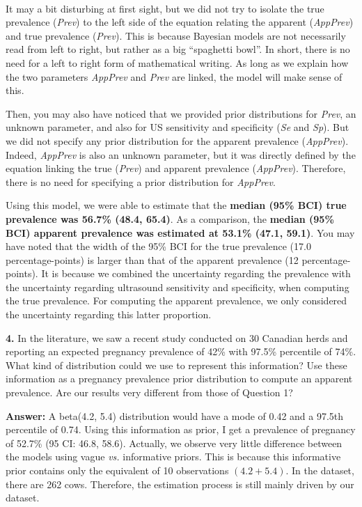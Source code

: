 \documentclass[
]{book}
\begin{document}
\strut \\
It may a bit disturbing at first sight, but we did not try to isolate the true prevalence (\emph{Prev}) to the left side of the equation relating the apparent (\emph{AppPrev}) and true prevalence (\emph{Prev}). This is because Bayesian models are not necessarily read from left to right, but rather as a big ``spaghetti bowl''. In short, there is no need for a left to right form of mathematical writing. As long as we explain how the two parameters \emph{AppPrev} and \emph{Prev} are linked, the model will make sense of this.

Then, you may also have noticed that we provided prior distributions for \emph{Prev}, an unknown parameter, and also for US sensitivity and specificity (\emph{Se} and \emph{Sp}). But we did not specify any prior distribution for the apparent prevalence (\emph{AppPrev}). Indeed, \emph{AppPrev} is also an unknown parameter, but it was directly defined by the equation linking the true (\emph{Prev}) and apparent prevalence (\emph{AppPrev}). Therefore, there is no need for specifying a prior distribution for \emph{AppPrev}.

Using this model, we were able to estimate that the \textbf{median (95\% BCI) true prevalence was 56.7\% (48.4, 65.4)}. As a comparison, the \textbf{median (95\% BCI) apparent prevalence was estimated at 53.1\% (47.1, 59.1)}. You may have noted that the width of the 95\% BCI for the true prevalence (17.0 percentage-points) is larger than that of the apparent prevalence (12 percentage-points). It is because we combined the uncertainty regarding the prevalence with the uncertainty regarding ultrasound sensitivity and specificity, when computing the true prevalence. For computing the apparent prevalence, we only considered the uncertainty regarding this latter proportion.

\textbf{4.} In the literature, we saw a recent study conducted on 30 Canadian herds and reporting an expected pregnancy prevalence of 42\% with 97.5\% percentile of 74\%. What kind of distribution could we use to represent this information? Use these information as a pregnancy prevalence prior distribution to compute an apparent prevalence. Are our results very different from those of Question 1?

\textbf{Answer:} A beta(4.2, 5.4) distribution would have a mode of 0.42 and a 97.5th percentile of 0.74. Using this information as prior, I get a prevalence of pregnancy of 52.7\% (95 CI: 46.8, 58.6). Actually, we observe very little difference between the models using vague \emph{vs.} informative priors. This is because this informative prior contains only the equivalent of 10 observations \((4.2+5.4)\). In the dataset, there are 262 cows. Therefore, the estimation process is still mainly driven by our dataset.
\end{document}
